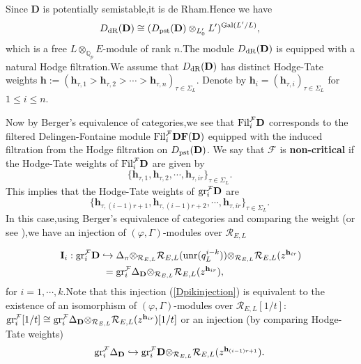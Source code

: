 \documentclass[SecEq,CM,GP]{degruyter-crelle} %
\theoremstyle{plain}
\newcommand{\df}{{\mathbf{DF}}}
\newcommand{\dr}{{\rm dR}}
\newcommand{\Dpik}{{\mathbf{D}}}
\newcommand{\fil}{{\rm Fil}}
\newcommand{\gal}{{\rm Gal}}
\newcommand{\gr}{{\rm gr}}
\newcommand{\hpi}{{{\mathbf{h}}}}
\newcommand{\pst}{{\rm pst}}
\newcommand{\tee}{{{\otimes}_{\cR_{E,L}}}}
\newcommand{\unr}{{\rm unr}}
\newcommand{\BQ}{{\mathbb{Q}}}
\newcommand{\bB}{{\mathbf{B}}}
\newcommand{\bG}{{\mathbf{G}}}
\newcommand{\bh}{{\mathbf{h}}}
\newcommand{\cR}{\mathcal R}
\newcommand{\cF}{\mathcal F}
\begin{document}
Since $\Dpik$ is potentially semistable,\;it is de Rham.\;Hence we have \[D_{\dr}(\Dpik)\cong (D_{\pst}(\Dpik)\otimes_{L_0'}L')^{\gal(L'/L)},\;\] which  is a free $L\otimes_{\BQ_p}E$-module of rank $n$.\;The module $D_{\dr}(\Dpik)$ is equipped with a natural Hodge filtration.\;We assume that $D_{\dr}(\Dpik)$  has distinct Hodge-Tate weights $\bh:=(\hpi_{\tau,1}>\hpi_{\tau,2}>\cdots>\hpi_{\tau,n} )_{\tau\in \Sigma_L}$. Denote by $\hpi_{i}=(\hpi_{\tau,i})_{\tau\in \Sigma_L}$ for $1\leq i\leq n$.\;

Now by Berger's equivalence of categories,\;we see that $\fil_i^{\cF}\Dpik$ corresponds to the filtered Delingen-Fontaine module $\fil_i^{\cF} \df(\Dpik)$ equipped with the induced filtration from the Hodge filtration on $D_{\pst}(\Dpik)$. We say that $\cF$ is \textbf{non-critical} if the Hodge-Tate weights of $\fil_i^{\cF}\Dpik$ are given by $$\{\hpi_{\tau,1},\hpi_{\tau,2},\cdots,\hpi_{\tau,ir}\}_{\tau\in \Sigma_L}.\;$$
This implies that the Hodge-Tate weights of $\gr_i^{\cF} \Dpik$ are $$\{\hpi_{\tau,(i-1)r+1},\hpi_{\tau,(i-1)r+2},\cdots,\hpi_{\tau,ir}\}_{\tau\in \Sigma_L}.\;$$
In this case,\;using Berger's equivalence of categories \cite[Theorem  A]{berger2008equations} and comparing the weight (or see \cite[(2.4)]{Ding2021}),\;we have an injection of $(\varphi,\Gamma)$-modules over $\cR_{E,L}$

\begin{align}\label{Dpikinjection}
	\mathbf{I}_{i}:	\gr_{i}^{\cF} \Dpik \hookrightarrow&\;{\Delta_\pi}\tee \cR_{E,L}(\unr(q_L^{i-k}))\tee \cR_{E,L}(z^{\hpi_{ir}})\\=&\;\gr^{\cF}_i{\Delta_\Dpik}\tee \cR_{E,L}(z^{\hpi_{ir}}),\nonumber
\end{align}
for $i=1,\cdots,k$.\;Note that this injection (\ref{Dpikinjection}) is equivalent to the existence of an isomorphism of $(\varphi,\Gamma)$-modules over $\cR_{E,L}[1/t]$:
$\gr_{i}^{\cF}[1/t]\cong\gr^{\cF}_i{\Delta_\Dpik}\tee \cR_{E,L}(z^{\hpi_{ir}})[1/t]$ or an injection (by comparing Hodge-Tate weights) $$\gr^{\cF}_i{\Delta_\Dpik}  \hookrightarrow \gr_{i}^{\cF}\Dpik\tee \cR_{E,L}(z^{\hpi_{(i-1)r+1}}).\;$$ 
\end{document}
